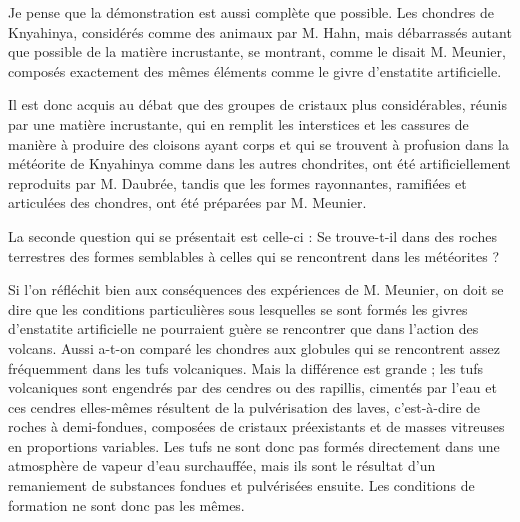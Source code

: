 \documentclass[a4paper, 12pt, oneside, french]{book}
\begin{document}
Je pense que la démonstration est aussi complète que possible. Les chondres de Knyahinya, considérés comme des animaux par M. Hahn, mais débarrassés autant que possible de la matière incrustante, se montrant, comme le disait M. Meunier, composés exactement des mêmes éléments comme le givre d'enstatite artificielle.

Il est donc acquis au débat que des groupes de cristaux plus considérables, réunis par une matière incrustante, qui en remplit les interstices et les cassures de manière à produire des cloisons ayant corps et qui se trouvent à profusion dans la météorite de Knyahinya comme dans les autres chondrites, ont été artificiellement reproduits par M. Daubrée, tandis que les formes rayonnantes, ramifiées et articulées des chondres, ont été préparées par M. Meunier.

La seconde question qui se présentait est celle-ci : Se trouve-t-il dans des roches terrestres des formes semblables à celles qui se rencontrent dans les météorites ?

Si l'on réfléchit bien aux conséquences des expériences de M. Meunier, on doit se dire que les conditions particulières sous lesquelles se sont formés les givres d'enstatite artificielle ne pourraient guère se rencontrer que dans l'action des volcans. Aussi a-t-on comparé les chondres aux globules qui se rencontrent assez fréquemment dans les tufs volcaniques. Mais la différence est grande ; les tufs volcaniques sont engendrés par des cendres ou des rapillis, cimentés par l'eau et ces cendres elles-mêmes résultent de la pulvérisation des laves, c'est-à-dire de roches à demi-fondues, composées de cristaux préexistants et de masses vitreuses en proportions variables. Les tufs ne sont donc pas formés directement dans une atmosphère de vapeur d'eau surchauffée, mais ils sont le résultat d'un remaniement de substances fondues et pulvérisées ensuite. Les conditions de formation ne sont donc pas les mêmes.
\end{document}
